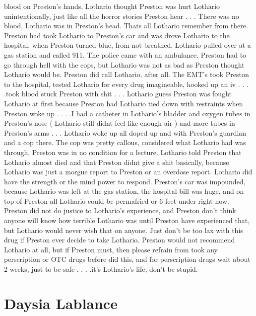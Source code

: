 \documentclass[12pt]{book}
\begin{document}
blood on Preston's hands, Lothario thought Preston was hurt Lothario unintentionally, just like all the horror stories Preston hear . . .  There was no blood, Lothario was in Preston's head. Thats all Lothario remember from there. Preston had took Lothario to Preston's car and was drove Lothario to the hospital, when Preston turned blue, from not breathed. Lothario pulled over at a gas station and called 911. The police came with an ambulance. Preston had to go through hell with the cops, but Lothario was not as bad as Preston thought Lothario would be. Preston did call Lothario, after all. The EMT's took Preston to the hospital, tested Lothario for every drug imagineable, hooked up an iv . . .  .took blood stuck Preston with shit . . .  Lothario guess Preston was fought Lothario at first because Preston had Lothario tied down with restraints when Preston woke up . . .  .I had a catheter in Lothario's bladder and oxygen tubes in Preston's nose ( Lothario still didnt feel like enough air ) and more tubes in Preston's arms . . .  Lothario woke up all doped up and with Preston's guardian and a cop there. The cop was pretty callous, considered what Lothario had was through, Preston was in no condition for a lecture. Lothario told Preston that Lothario almost died and that Preston didnt give a shit basically, because Lothario was just a morgue report to Preston or an overdose report. Lothario did have the strength or the mind power to respond. Preston's car was impounded, because Lothario was left at the gas station, the hospital bill was huge, and on top of Preston all Lothario could be permafried or 6 feet under right now. Preston did not do justice to Lothario's experience, and Preston don't think anyone will know how terrible Lothario was until Preston have experienced that, but Lothario would never wish that on anyone. Just don't be too lax with this drug if Preston ever decide to take Lothario. Preston would not recommend Lothario at all, but if Preston must, then please refrain from took any perscription or OTC drugs before did this, and for perscription drugs wait about 2 weeks, just to be safe . . .  .it's Lothario's life, don't be stupid.



\chapter{Daysia Lablance}
\end{document}
